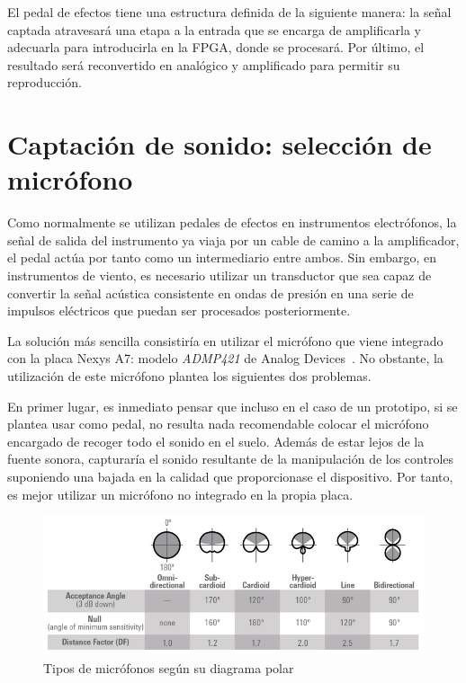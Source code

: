 El pedal de efectos tiene una estructura definida de la siguiente manera: la señal captada atravesará una etapa a la entrada que se encarga de amplificarla y adecuarla para introducirla en la FPGA, donde se procesará. Por último, el resultado será reconvertido en analógico y amplificado para permitir su reproducción.

\section{Captación de sonido: selección de micrófono}

Como normalmente se utilizan pedales de efectos en instrumentos electrófonos, la señal de salida del instrumento ya viaja por un cable de camino a la amplificador, el pedal actúa por tanto como un intermediario entre ambos. Sin embargo, en instrumentos de viento, es necesario utilizar un transductor que sea capaz de convertir la señal acústica consistente en ondas de presión en una serie de impulsos eléctricos que puedan ser procesados posteriormente.

La solución más sencilla consistiría en utilizar el micrófono que viene integrado con la placa Nexys A7: modelo \emph{ADMP421} de Analog Devices~\cite{Nexys}. No obstante, la utilización de este micrófono plantea los siguientes dos problemas.

En primer lugar, es inmediato pensar que incluso en el caso de un prototipo, si se plantea usar como pedal, no resulta nada recomendable colocar el micrófono encargado de recoger todo el sonido en el suelo. Además de estar lejos de la fuente sonora, capturaría el sonido resultante de la manipulación de los controles suponiendo una bajada en la calidad que proporcionase el dispositivo. Por tanto, es mejor utilizar un micrófono no integrado en la propia placa.

\begin{figure}
\begin{center}
\includegraphics[width=15cm]{img/micros.png}
\caption{\label{fig:polar_dig}Tipos de micrófonos según su diagrama polar~\cite{Mic}}
\end{center}
\end{figure}

